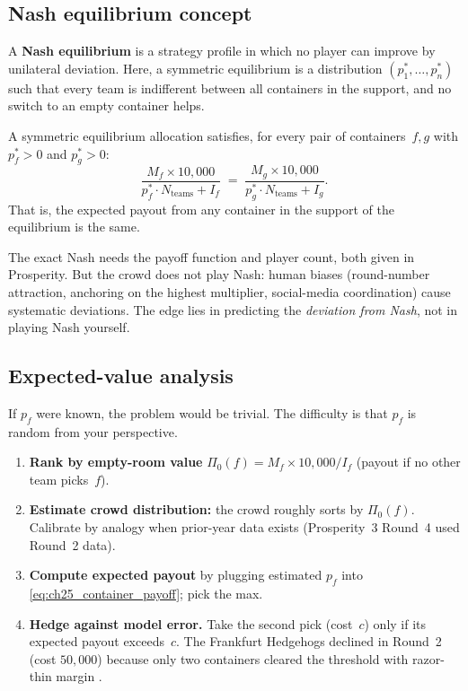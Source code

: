 \subsection{Nash equilibrium concept}

A \textbf{Nash equilibrium} is a strategy profile in which no
player can improve by unilateral deviation.  Here, a symmetric
equilibrium is a distribution $(p_1^*, \ldots, p_n^*)$ such that
every team is indifferent between all containers in the support,
and no switch to an empty container helps.

\begin{definition}
\label{def:ch25_container_nash}
A symmetric equilibrium allocation satisfies, for every pair of
containers~$f, g$ with $p_f^* > 0$ and $p_g^* > 0$:
\[
  \frac{M_f \times 10{,}000}
  {p_f^* \cdot N_{\text{teams}} + I_f}
  \;=\;
  \frac{M_g \times 10{,}000}
  {p_g^* \cdot N_{\text{teams}} + I_g}.
\]
That is, the expected payout from any container in the support
of the equilibrium is the same.
\end{definition}

The exact Nash needs the payoff function and player count, both
given in Prosperity.  But the crowd does not play Nash: human
biases (round-number attraction, anchoring on the highest
multiplier, social-media coordination) cause systematic deviations.
The edge lies in predicting the \emph{deviation from Nash}, not
in playing Nash yourself.

\subsection{Expected-value analysis}

If $p_f$ were known, the problem would be trivial.  The
difficulty is that $p_f$ is random from your perspective.

\begin{enumerate}
  \item \textbf{Rank by empty-room value}
  $\Pi_0(f) = M_f \times 10{,}000 / I_f$ (payout if no other
  team picks~$f$).

  \item \textbf{Estimate crowd distribution:} the crowd roughly
  sorts by $\Pi_0(f)$.  Calibrate by analogy when prior-year data
  exists (Prosperity~3 Round~4 used Round~2 data).

  \item \textbf{Compute expected payout} by plugging estimated
  $p_f$ into \cref{eq:ch25_container_payoff}; pick the max.

  \item \textbf{Hedge against model error.}  Take the second
  pick (cost~$c$) only if its expected payout exceeds~$c$.  The
  Frankfurt Hedgehogs declined in Round~2 (cost $50{,}000$) because
  only two containers cleared the threshold with razor-thin margin
  \citep{frankfurtHedgehogs2025imcP3}.
\end{enumerate}

